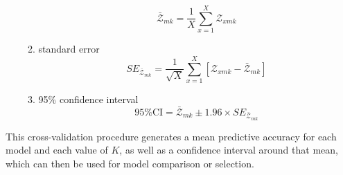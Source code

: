 \documentclass[12pt]{article}
\begin{document}
\begin{enumerate}
\begin{enumerate}
		\begin{equation}
			\bar{\mathcal{Z}}_{mk} = \frac{1}{X}\sum\limits_{x=1}^{X}\mathcal{Z}_{xmk}
		\end{equation}
	\item standard error
		\begin{equation}
			SE_{\bar{\mathcal{Z}}_{mk}} = \frac{1}{\sqrt{X}}\sum\limits_{x=1}^{X} \left[ {\mathcal{Z}_{xmk} - \bar{\mathcal{Z}}_{mk}} \right]
		\end{equation}
	\item 95\% confidence interval
		\begin{equation}
			95\% \text{CI} = \bar{\mathcal{Z}}_{mk} \pm 1.96 \times SE_{\bar{\mathcal{Z}}_{mk}}
		\end{equation}
	\end{enumerate}
\end{enumerate}

This cross-validation procedure generates a mean predictive accuracy for each model and each value of $K$, 
as well as a confidence interval around that mean,
which can then be used for model comparison or selection.

\newpage



\newpage

\end{document}
